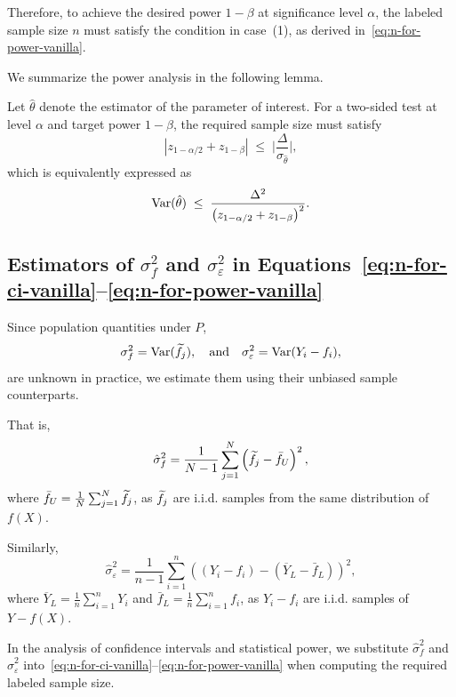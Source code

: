 \noindent
Therefore, to achieve the desired power $1-\beta$ at significance level $\alpha$, the labeled sample size $n$ must satisfy the condition in case~(1), as derived in~\eqref{eq:n-for-power-vanilla}.

\noindent
We summarize the power analysis in the following lemma.
\begin{lemma}
\label{lem:n-power}
Let $\hat{\theta}$ denote the estimator of the parameter of interest. For a two-sided test at level $\alpha$ and target power $1-\beta$, the required sample size must satisfy 
\[|z_{1-\alpha/2} + z_{1-\beta}| \;\le\; \Bigg|\frac{\Delta}{\sigma_{\hat \theta}}\Bigg|,\]
which is equivalently expressed as
\[
\mathrm{Var}(\hat \theta) \;\le\; \frac{\Delta^2}{\big(z_{1-\alpha/2} + z_{1-\beta}\big)^2}.
\]\end{lemma}

\subsection{Estimators of $\sigma^2_f$ and $\sigma^2_\varepsilon$ in Equations~\eqref{eq:n-for-ci-vanilla}--\eqref{eq:n-for-power-vanilla}}
\label{subsec:estimator_sigma_f}

Since population quantities under $P$,
\[
\sigma_f^2 = \mathrm{Var}(\widetilde{f}_j),
\quad\text{and}\quad
\sigma_\varepsilon^2 = \mathrm{Var}(Y_i - f_i),
\]
are unknown in practice, we estimate them using their unbiased sample counterparts.

\noindent
That is, \[
\hat\sigma^2_f=\frac{1}{N-1}\sum^N_{j=1}\left(\widetilde f_j-\bar{f}_U\right)^2,
\]where $\bar{f}_U=\frac{1}{N}\sum^N_{j=1}\widetilde f_j$, as $\widetilde f_j$ are i.i.d. samples from the same distribution of $f(X)$.

\noindent
Similarly, \[
\hat\sigma^2_\varepsilon=\frac{1}{n-1}\sum^n_{i=1}\left(\left(Y_i-f_i\right)-\left(\overline{Y}_L-\bar f_L\right)\right)^2,
\]where $\overline{Y}_L=\frac{1}{n}\sum^n_{i=1} Y_i$ and $\bar{f}_L=\frac{1}{n}\sum^n_{i=1} f_i$, as $Y_i-f_i$ are i.i.d. samples of $Y-f(X)$.

\noindent
In the analysis of confidence intervals and statistical power, we substitute $\widehat{\sigma}_f^2$ and $\widehat{\sigma}_\varepsilon^2$ into~\eqref{eq:n-for-ci-vanilla}--\eqref{eq:n-for-power-vanilla} when computing the required labeled sample size.


